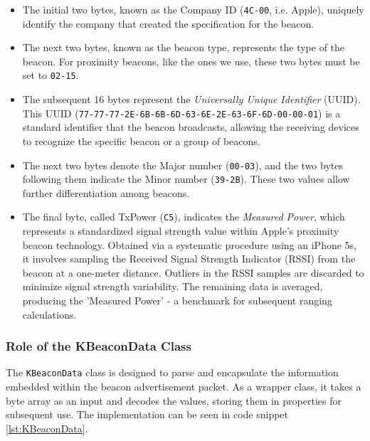 \begin{itemize}
  \item The initial two bytes, known as the Company ID (\texttt{4C-00}, i.e. Apple), uniquely identify the company that created the specification for the beacon.
  \item The next two bytes, known as the beacon type, represents the type of the beacon. For proximity beacons, like the ones we use, these two bytes must be set to \texttt{02-15}.
  \item The subsequent 16 bytes represent the \textit{Universally Unique Identifier} (UUID).
This UUID (\texttt{77-77-77-2E-6B-6B-6D-63-6E-2E-63-6F-6D-00-00-01}) is a standard identifier that the beacon broadcasts, allowing the receiving devices to recognize the specific beacon or a group of beacons.
  \item The next two bytes denote the Major number (\texttt{00-03}), and the two bytes following them indicate the Minor number (\texttt{39-2B}).
These two values allow further differentiation among beacons.
  \item The final byte, called TxPower (\texttt{C5}), indicates the \textit{Measured Power}, which represents a standardized signal strength value within Apple's proximity beacon technology. Obtained via a systematic procedure using an iPhone 5s, it involves sampling the Received Signal Strength Indicator (RSSI) from the beacon at a one-meter distance. Outliers in the RSSI samples are discarded to minimize signal strength variability. The remaining data is averaged, producing the 'Measured Power' - a benchmark for subsequent ranging calculations.
\end{itemize}

\subsubsection{Role of the KBeaconData Class}

The \texttt{KBeaconData} class is designed to parse and encapsulate the information embedded within the beacon advertisement packet.
As a wrapper class, it takes a byte array as an input and decodes the values, storing them in properties for subsequent use.
The implementation can be seen in code snippet \ref{lst:KBeaconData}.



